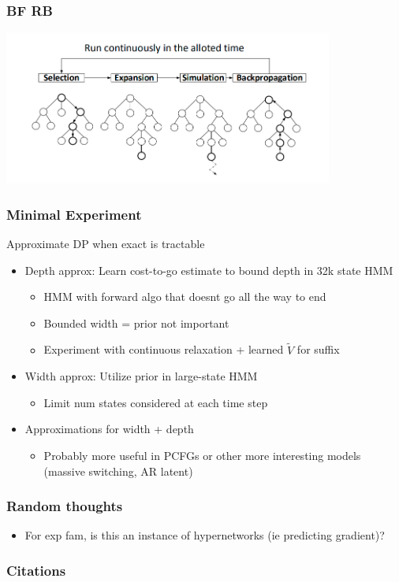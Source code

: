\documentclass{beamer}
\begin{document}
\begin{frame}
\frametitle{BF RB}
\includegraphics[height=2in]{img/mcts.png}
\end{frame}

\begin{frame}
\frametitle{Minimal Experiment}
Approximate DP when exact is tractable
\begin{itemize}
\item Depth approx: Learn cost-to-go estimate to bound depth in 32k state HMM
    \begin{itemize}
    \item HMM with forward algo that doesnt go all the way to end
    \item Bounded width = prior not important
    \item Experiment with continuous relaxation + learned $\tilde{V}$
        for suffix
    \end{itemize}
\item Width approx: Utilize prior in large-state HMM
    \begin{itemize}
    \item Limit num states considered at each time step
    \end{itemize}
\item Approximations for width + depth
    \begin{itemize}
    \item Probably more useful in PCFGs or other more interesting models
        (massive switching, AR latent)
    \end{itemize}
\end{itemize}
\end{frame}

\begin{frame}
\frametitle{Random thoughts}
\begin{itemize}
\item For exp fam, is this an instance of hypernetworks (ie predicting gradient)?
\end{itemize}
\end{frame}

\begin{frame}[allowframebreaks]
\frametitle{Citations}

\end{frame}
\end{document}
